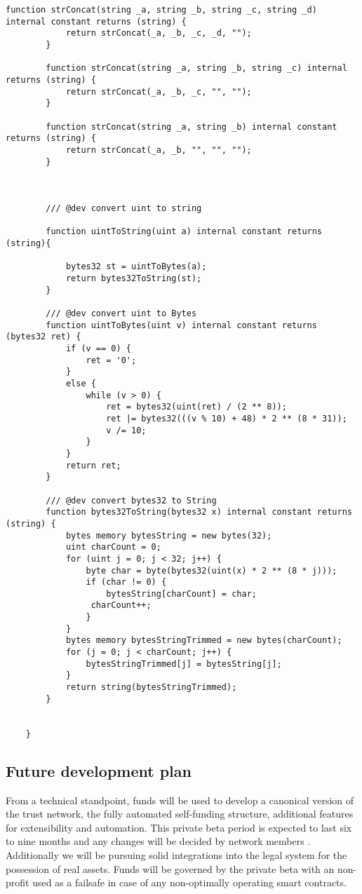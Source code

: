 \documentclass{article}
\begin{document}
\begin{lstlisting}[style=MyCStyle]
        function strConcat(string _a, string _b, string _c, string _d) internal constant returns (string) {
            return strConcat(_a, _b, _c, _d, "");
        }

        function strConcat(string _a, string _b, string _c) internal returns (string) {
            return strConcat(_a, _b, _c, "", "");
        }

        function strConcat(string _a, string _b) internal constant returns (string) {
            return strConcat(_a, _b, "", "", "");
        }



        /// @dev convert uint to string

        function uintToString(uint a) internal constant returns (string){

            bytes32 st = uintToBytes(a);
            return bytes32ToString(st);
        }

        /// @dev convert uint to Bytes
        function uintToBytes(uint v) internal constant returns (bytes32 ret) {
            if (v == 0) {
                ret = '0';
            }
            else {
                while (v > 0) {
                    ret = bytes32(uint(ret) / (2 ** 8));
                    ret |= bytes32(((v % 10) + 48) * 2 ** (8 * 31));
                    v /= 10;
                }
            }
            return ret;
        }

        /// @dev convert bytes32 to String
        function bytes32ToString(bytes32 x) internal constant returns (string) {
            bytes memory bytesString = new bytes(32);
            uint charCount = 0;
            for (uint j = 0; j < 32; j++) {
                byte char = byte(bytes32(uint(x) * 2 ** (8 * j)));
                if (char != 0) {
                    bytesString[charCount] = char;
                 charCount++;
                }
            }
            bytes memory bytesStringTrimmed = new bytes(charCount);
            for (j = 0; j < charCount; j++) {
                bytesStringTrimmed[j] = bytesString[j];
            }
            return string(bytesStringTrimmed);
        }


    }
\end{lstlisting}

\subsection {Future development plan}

From a technical standpoint, funds will be used to develop a canonical version of the trust network, the fully automated self-funding structure, additional features for extensibility and automation. This private beta period is expected to last six to nine months and any changes will be decided by network members . Additionally we will be pursuing solid integrations into the legal system for the possession of real assets. Funds will be governed by the private beta with an  non-profit used as a failsafe in case of any non-optimally operating smart contracts.
\end{document}
